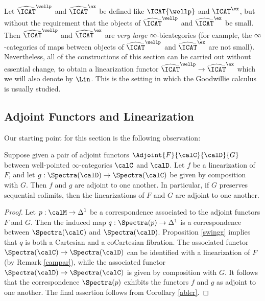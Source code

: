 \begin{variant}
Let $\widehat{\ICAT}^{\wellp}$ and $\widehat{\ICAT}^{\ex}$ be defined like
$\ICAT{\wellp}$ and $\ICAT^{\ex}$, but without the requirement that the objects
of $\widehat{\ICAT}^{\wellp}$ and $\widehat{\ICAT}^{\ex}$ be small.
Then $\widehat{\ICAT}^{\wellp}$ and $\widehat{\ICAT}^{\ex}$ are {\em very large}
$\infty$-bicategories (for example, the $\infty$-categories of maps between objects of
$\widehat{\ICAT}^{\wellp}$ and $\widehat{\ICAT}^{\ex}$ are not small). Nevertheless,
all of the constructions of this section can be carried out without essential change, to obtain
a linearization functor $\widehat{ \ICAT}^{\wellp} \rightarrow \widehat{\ICAT}^{\ex}$ which
we will also denote by $\Lin$. This is the setting in which the Goodwillie calculus 
is usually studied.
\end{variant}


\subsection{Adjoint Functors and Linearization}\label{linadj}\label{bisec5.4}

Our starting point for this section is the following observation:

\begin{proposition}\label{summm}
Suppose given a pair of adjoint functors
$\Adjoint{F}{\calC}{\calD}{G}$
between well-pointed $\infty$-categories $\calC$ and $\calD$.
Let $f$ be a linearization of $F$, and let $g: \Spectra(\calD) \rightarrow \Spectra(\calC)$
be given by composition with $G$. Then $f$ and $g$ are adjoint to one another.
In particular, if $G$ preserves sequential colimits, then the linearizations
of $F$ and $G$ are adjoint to one another.
\end{proposition}

\begin{proof}
Let $p: \calM \rightarrow \Delta^1$ be a correspondence associated to the adjoint functors
$F$ and $G$. Then the induced map $q: \Spectra(p) \rightarrow \Delta^1$ is a correspondence between $\Spectra(\calC)$ and $\Spectra(\calD)$. 
Proposition \ref{swingg} implies that $q$ is both a Cartesian and a coCartesian fibration.
The associated functor $\Spectra(\calC) \rightarrow \Spectra(\calD)$ can be identified
with a linearization of $F$ (by Remark \ref{campar}), while the associated functor
$\Spectra(\calD) \rightarrow \Spectra(\calC)$ is given by composition with $G$.
It follows that the correspondence $\Spectra(p)$ exhibits the functors $f$ and $g$ as adjoint to one another. The final assertion follows from Corollary \ref{abler}.
\end{proof}

